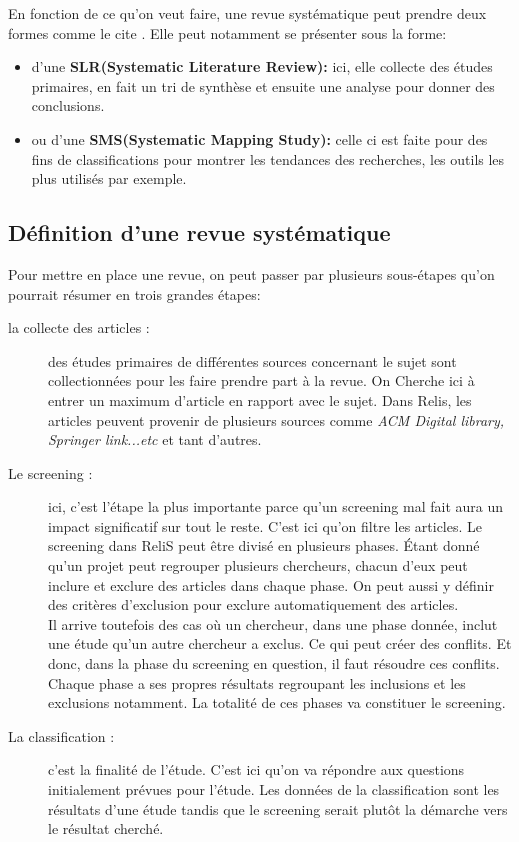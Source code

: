 En fonction de ce qu'on veut faire, une revue systématique peut prendre deux formes comme le cite \cite{brice}. Elle peut notamment se présenter sous la forme: 
\begin{itemize}
\item d'une \textbf{SLR(Systematic Literature Review):} ici, elle collecte des études primaires, en fait un tri de synthèse et ensuite une analyse pour donner des conclusions.
\item ou d'une \textbf{SMS(Systematic Mapping Study):} celle ci est faite pour des fins de classifications pour montrer les tendances des recherches, les outils les plus utilisés par exemple.
\end{itemize} 
\vspace*{2mm} 

\subsection{Définition d'une revue systématique}

Pour mettre en place une revue, on peut passer par plusieurs sous-étapes qu'on pourrait résumer en trois grandes étapes:
   
\begin{description}
    \item[la collecte des articles : ] des études primaires de différentes sources concernant le sujet sont collectionnées pour les faire prendre part à la revue. On Cherche ici à entrer un maximum d'article en rapport avec le sujet. Dans Relis, les articles peuvent provenir de plusieurs sources comme \textit{ACM Digital library, Springer link...etc} et tant d'autres.
    \item[Le screening :] ici, c'est l'étape la plus importante parce qu'un screening mal fait aura un impact significatif sur tout le reste. C'est ici qu'on filtre les articles. Le screening dans ReliS peut être divisé en plusieurs phases. Étant donné qu'un projet peut regrouper plusieurs chercheurs, chacun d'eux peut inclure et exclure des articles dans chaque phase. On peut aussi y définir des critères d'exclusion pour exclure automatiquement des articles. \\
    Il arrive toutefois des cas où un chercheur, dans une phase donnée, inclut une étude qu'un autre chercheur a exclus. Ce qui peut créer des conflits. Et donc, dans la phase du screening en question, il faut résoudre ces conflits. Chaque phase a ses propres résultats regroupant les inclusions et les exclusions notamment. La totalité de ces phases va constituer le screening.
    \item[La classification :] c'est la finalité de l'étude. C'est ici qu'on va répondre aux questions initialement prévues pour l'étude. Les données de la classification sont les résultats d'une étude tandis que le screening serait plutôt la démarche vers le résultat cherché.
\end{description}

